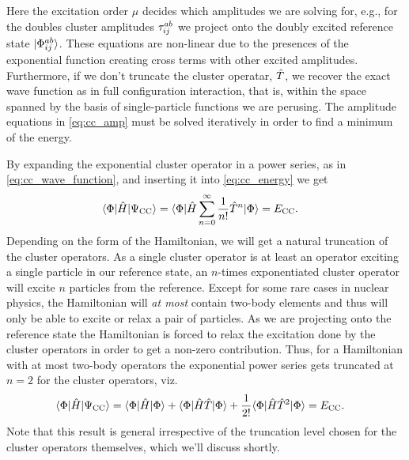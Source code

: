         Here the excitation order $\mu$ decides which amplitudes we are solving
        for, e.g., for the doubles cluster amplitudes $\tau^{ab}_{ij}$ we
        project onto the doubly excited reference state $| \Phi^{ab}_{ij} \rangle$.
        These equations are non-linear due to the presences of the exponential
        function creating cross terms with other excited amplitudes.
        Furthermore, if we don't truncate the cluster operatar, $\hat{T}$, we
        recover the exact wave function as in full configuration interaction,
        that is, within the space spanned by the basis of single-particle
        functions we are perusing.
        The amplitude equations in \autoref{eq:cc_amp} must be solved
        iteratively in order to find a minimum of the energy.

        By expanding the exponential cluster operator in a power series, as in
        \autoref{eq:cc_wave_function}, and inserting it into
        \autoref{eq:cc_energy} we get
        \begin{align}
            \langle \Phi |\hat{H} | \Psi_{\text{CC}} \rangle
            &=
            \langle \Phi |\hat{H}
            \sum_{n = 0}^{\infty} \frac{1}{n!}\hat{T}^n
            | \Phi \rangle
            = E_{\text{CC}}.
        \end{align}
        Depending on the form of the Hamiltonian, we will get a natural
        truncation of the cluster operators.
        As a single cluster operator is at
        least an operator exciting a single particle in our reference state, an
        $n$-times exponentiated cluster operator will excite $n$ particles from
        the reference.
        Except for some rare cases in nuclear physics,
        the Hamiltonian will \emph{at most} contain two-body elements and thus
        will only be able to excite or relax a pair of particles.
        As we are projecting onto the reference state the Hamiltonian is forced
        to relax the excitation done by the cluster operators in order to get a
        non-zero contribution.
        Thus, for a Hamiltonian with at most two-body operators the exponential
        power series gets truncated at $n = 2$ for the cluster operators, viz.
        \begin{align}
            \langle \Phi |\hat{H} | \Psi_{\text{CC}} \rangle
            &=
            \langle \Phi |\hat{H}| \Phi \rangle
            + \langle \Phi |\hat{H} \hat{T} | \Phi \rangle
            + \frac{1}{2!}
            \langle \Phi | \hat{H} \hat{T}^2 | \Phi \rangle
            = E_{\text{CC}}.
        \end{align}
        Note that this result is general irrespective of the truncation level
        chosen for the cluster operators themselves, which we'll discuss
        shortly.

